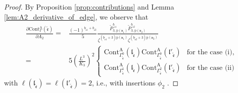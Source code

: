 \documentclass[12pt]{amsart}
\numberwithin{equation}{section}
\begin{document}
\begin{proof}
By Proposition \ref{prop:contributions} and Lemma \ref{lem:A2_derivative_of_edge}, we observe that
\begin{equation*}
\begin{aligned}
\frac{\partial \mathrm{Cont}_{\Gamma}^{\mathrm{A}}(\tilde{\mathfrak{e}}) }{\partial A_2}
=&\frac{(-1)^{b_{\tilde{\mathfrak{e}}1}+b_{\tilde{\mathfrak{e}}2}}}{5} \frac{\widetilde{P}_{3,\mathrm{p}(\mathfrak{v}_1)}^{b_{\tilde{\mathfrak{e}}1}}\widetilde{P}_{3,\mathrm{p}(\mathfrak{v}_2)}^{b_{\tilde{\mathfrak{e}}2}}}{\zeta^{(b_{\tilde{\mathfrak{e}}1}+3)\mathrm{p}(\mathfrak{v}_1)}\zeta^{(b_{\tilde{\mathfrak{e}}2}+3)\mathrm{p}(\mathfrak{v}_2)}}\\
=&5\left(\frac{L^{3}}{K_{3}}\right)^2
\begin{cases}
\mathrm{Cont}_{\Gamma_{\tilde{\mathfrak{e}}}^0}^{\mathrm{A}}(\mathfrak{l}_{\tilde{\mathfrak{e}}})\mathrm{Cont}_{\Gamma_{\tilde{\mathfrak{e}}}^0}^{\mathrm{A}}(\mathfrak{l}'_{\tilde{\mathfrak{e}}})&\text{for the case (i)},\\
\mathrm{Cont}_{\Gamma_{\tilde{\mathfrak{e}}}^1}^{\mathrm{A}}(\mathfrak{l}_{\tilde{\mathfrak{e}}})\mathrm{Cont}_{\Gamma_{\tilde{\mathfrak{e}}}^2}^{\mathrm{A}}(\mathfrak{l}'_{\tilde{\mathfrak{e}}})&\text{for the case (ii)}
\end{cases}
\end{aligned}
\end{equation*}
with $\ell(\mathfrak{l}_{\tilde{\mathfrak{e}}})=\ell(\mathfrak{l}'_{\tilde{\mathfrak{e}}})=2$, i.e., with insertions $\phi_2$
.


\end{proof}
\end{document}
